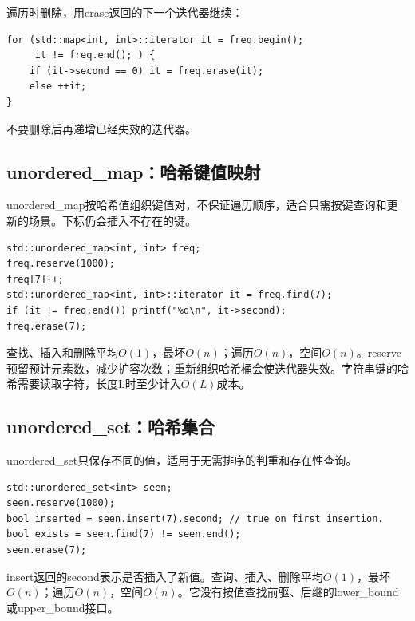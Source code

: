 \documentclass[UTF8,11pt,a4paper,fontset=none]{ctexart}
\begin{document}
遍历时删除，用erase返回的下一个迭代器继续：
\par\noindent\begin{minipage}{\linewidth}
\begin{lstlisting}
for (std::map<int, int>::iterator it = freq.begin();
     it != freq.end(); ) {
    if (it->second == 0) it = freq.erase(it);
    else ++it;
}
\end{lstlisting}
\end{minipage}\par
不要删除后再递增已经失效的迭代器。

\subsection{unordered\_map：哈希键值映射}
unordered\_map按哈希值组织键值对，不保证遍历顺序，适合只需按键查询和更新的场景。下标仍会插入不存在的键。
\par\noindent\begin{minipage}{\linewidth}
\begin{lstlisting}
std::unordered_map<int, int> freq;
freq.reserve(1000);
freq[7]++;
std::unordered_map<int, int>::iterator it = freq.find(7);
if (it != freq.end()) printf("%d\n", it->second);
freq.erase(7);
\end{lstlisting}
\end{minipage}\par
查找、插入和删除平均$O(1)$，最坏$O(n)$；遍历$O(n)$，空间$O(n)$。reserve预留预计元素数，减少扩容次数；重新组织哈希桶会使迭代器失效。字符串键的哈希需要读取字符，长度L时至少计入$O(L)$成本。

\subsection{unordered\_set：哈希集合}
unordered\_set只保存不同的值，适用于无需排序的判重和存在性查询。
\par\noindent\begin{minipage}{\linewidth}
\begin{lstlisting}
std::unordered_set<int> seen;
seen.reserve(1000);
bool inserted = seen.insert(7).second; // true on first insertion.
bool exists = seen.find(7) != seen.end();
seen.erase(7);
\end{lstlisting}
\end{minipage}\par
insert返回的second表示是否插入了新值。查询、插入、删除平均$O(1)$，最坏$O(n)$；遍历$O(n)$，空间$O(n)$。它没有按值查找前驱、后继的lower\_bound或upper\_bound接口。
\end{document}
